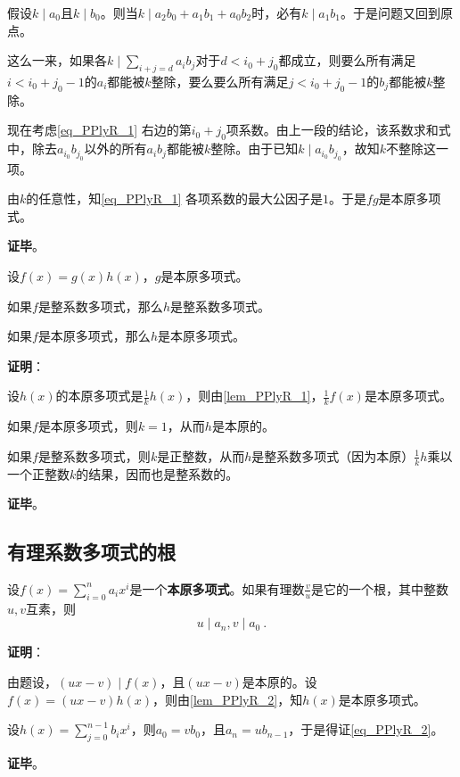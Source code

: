 假设$k\mid a_0$且$k\mid b_0$。则当$k\mid a_2b_0+a_1b_1+a_0b_2$时，必有$k\mid a_1b_1$。于是问题又回到原点。

这么一来，如果各$k\mid\sum_{i+j=d}a_ib_j$对于$d<i_0+j_0$都成立，则要么所有满足$i<i_0+j_0-1$的$a_i$都能被$k$整除，要么要么所有满足$j<i_0+j_0-1$的$b_j$都能被$k$整除。

现在考虑\autoref{eq_PPlyR_1} 右边的第$i_0+j_0$项系数。由上一段的结论，该系数求和式中，除去$a_{i_0}b_{j_0}$以外的所有$a_ib_j$都能被$k$整除。由于已知$k\mid a_{i_0}b_{j_0}$，故知$k$不整除这一项。

由$k$的任意性，知\autoref{eq_PPlyR_1} 各项系数的最大公因子是$1$。于是$fg$是本原多项式。



\textbf{证毕}。



\begin{lemma}{}\label{lem_PPlyR_2}
设$f(x)=g(x)h(x)$，$g$是本原多项式。

如果$f$是整系数多项式，那么$h$是整系数多项式。

如果$f$是本原多项式，那么$h$是本原多项式。
\end{lemma}

\textbf{证明}：

设$h(x)$的本原多项式是$\frac{1}{k}h(x)$，则由\autoref{lem_PPlyR_1}，$\frac{1}{k}f(x)$是本原多项式。

如果$f$是本原多项式，则$k=1$，从而$h$是本原的。

如果$f$是整系数多项式，则$k$是正整数，从而$h$是整系数多项式（因为本原）$\frac{1}{k}h$乘以一个正整数$k$的结果，因而也是整系数的。



\textbf{证毕}。




\subsection{有理系数多项式的根}

\begin{theorem}{}
设$f(x)=\sum_{i=0}^n a_ix^i$是一个\textbf{本原多项式}。如果有理数$\frac{v}{u}$是它的一个根，其中整数$u, v$互素，则
\begin{equation}\label{eq_PPlyR_2}
u\mid a_n, v\mid a_0~.
\end{equation}
\end{theorem}

\textbf{证明}：

由题设，$(ux-v)\mid f(x)$，且$(ux-v)$是本原的。设$f(x)=(ux-v)h(x)$，则由\autoref{lem_PPlyR_2}，知$h(x)$是本原多项式。

设$h(x)=\sum_{j=0}^{n-1} b_ix^i$，则$a_0=vb_0$，且$a_n=ub_{n-1}$，于是得证\autoref{eq_PPlyR_2}。

\textbf{证毕}。














